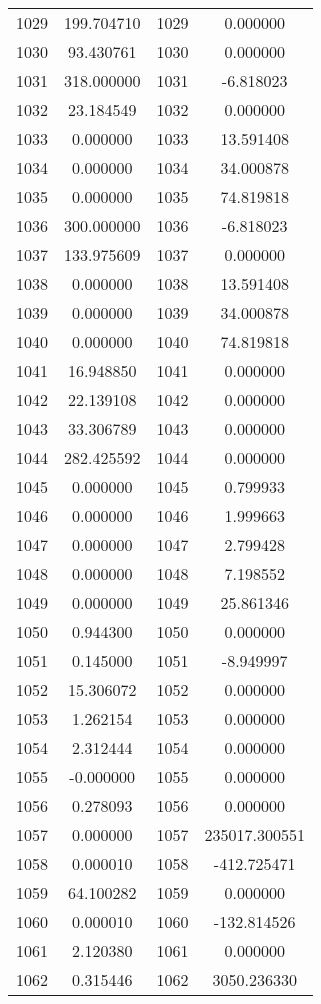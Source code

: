 \documentclass[12pt]{article}
\begin{document}
\begin{longtable}{@{}cccc@{}}
1029 & 199.704710 & 1029 & 0.000000 \\
1030 & 93.430761 & 1030 & 0.000000 \\
1031 & 318.000000 & 1031 & -6.818023 \\
1032 & 23.184549 & 1032 & 0.000000 \\
1033 & 0.000000 & 1033 & 13.591408 \\
1034 & 0.000000 & 1034 & 34.000878 \\
1035 & 0.000000 & 1035 & 74.819818 \\
1036 & 300.000000 & 1036 & -6.818023 \\
1037 & 133.975609 & 1037 & 0.000000 \\
1038 & 0.000000 & 1038 & 13.591408 \\
1039 & 0.000000 & 1039 & 34.000878 \\
1040 & 0.000000 & 1040 & 74.819818 \\
1041 & 16.948850 & 1041 & 0.000000 \\
1042 & 22.139108 & 1042 & 0.000000 \\
1043 & 33.306789 & 1043 & 0.000000 \\
1044 & 282.425592 & 1044 & 0.000000 \\
1045 & 0.000000 & 1045 & 0.799933 \\
1046 & 0.000000 & 1046 & 1.999663 \\
1047 & 0.000000 & 1047 & 2.799428 \\
1048 & 0.000000 & 1048 & 7.198552 \\
1049 & 0.000000 & 1049 & 25.861346 \\
1050 & 0.944300 & 1050 & 0.000000 \\
1051 & 0.145000 & 1051 & -8.949997 \\
1052 & 15.306072 & 1052 & 0.000000 \\
1053 & 1.262154 & 1053 & 0.000000 \\
1054 & 2.312444 & 1054 & 0.000000 \\
1055 & -0.000000 & 1055 & 0.000000 \\
1056 & 0.278093 & 1056 & 0.000000 \\
1057 & 0.000000 & 1057 & 235017.300551 \\
1058 & 0.000010 & 1058 & -412.725471 \\
1059 & 64.100282 & 1059 & 0.000000 \\
1060 & 0.000010 & 1060 & -132.814526 \\
1061 & 2.120380 & 1061 & 0.000000 \\
1062 & 0.315446 & 1062 & 3050.236330 \\

\end{longtable}
\end{document}
